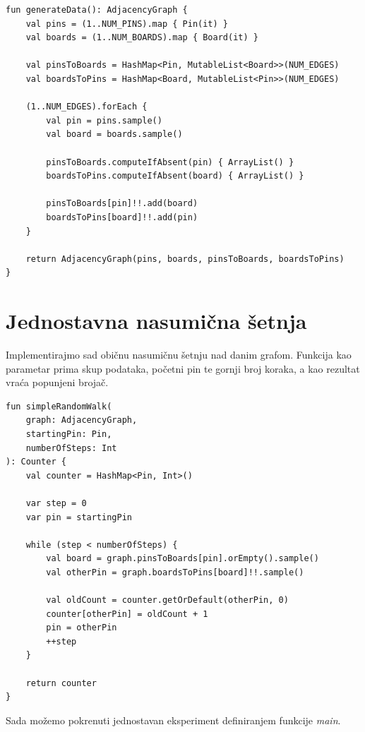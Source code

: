 \documentclass[times, utf8, seminar]{fer}
\begin{document}
\begin{lstlisting}
fun generateData(): AdjacencyGraph {
    val pins = (1..NUM_PINS).map { Pin(it) }
    val boards = (1..NUM_BOARDS).map { Board(it) }

    val pinsToBoards = HashMap<Pin, MutableList<Board>>(NUM_EDGES)
    val boardsToPins = HashMap<Board, MutableList<Pin>>(NUM_EDGES)

    (1..NUM_EDGES).forEach {
        val pin = pins.sample()
        val board = boards.sample()

        pinsToBoards.computeIfAbsent(pin) { ArrayList() }
        boardsToPins.computeIfAbsent(board) { ArrayList() }

        pinsToBoards[pin]!!.add(board)
        boardsToPins[board]!!.add(pin)
    }

    return AdjacencyGraph(pins, boards, pinsToBoards, boardsToPins)
}
\end{lstlisting}

\section{Jednostavna nasumična šetnja}

Implementirajmo sad običnu nasumičnu šetnju nad danim grafom. Funkcija kao parametar prima skup podataka, početni pin te gornji broj koraka, a kao rezultat vraća popunjeni brojač.

\begin{lstlisting}
fun simpleRandomWalk(
	graph: AdjacencyGraph,
	startingPin: Pin,
	numberOfSteps: Int
): Counter {
    val counter = HashMap<Pin, Int>()

    var step = 0
    var pin = startingPin

    while (step < numberOfSteps) {
        val board = graph.pinsToBoards[pin].orEmpty().sample()
        val otherPin = graph.boardsToPins[board]!!.sample()

        val oldCount = counter.getOrDefault(otherPin, 0)
        counter[otherPin] = oldCount + 1
        pin = otherPin
        ++step
    }

    return counter
}
\end{lstlisting}

Sada možemo pokrenuti jednostavan eksperiment definiranjem funkcije \textit{main}.
\end{document}
